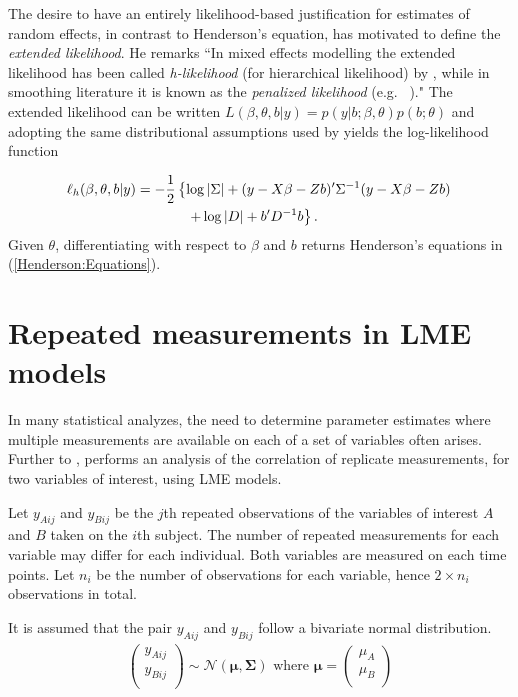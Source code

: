 \documentclass[12pt, a4paper]{article}
\theoremstyle{plain}
\theoremstyle{definition}
\theoremstyle{remark}
\begin{document}
The desire to have an entirely likelihood-based justification for estimates of random effects, in contrast to Henderson's equation, has motivated \citet[page 429]{Pawi:in:2001} to define the \emph{extended likelihood}. He remarks ``In mixed effects modelling the extended likelihood has been called \emph{h-likelihood} (for hierarchical  likelihood) by \cite{Lee:Neld:hier:1996}, while in smoothing literature it is known as the \emph{penalized likelihood} (e.g.\ \citeauthor{Gree:Silv:nonp:1994} \citeyear{Gree:Silv:nonp:1994})." The extended likelihood can be written $L(\beta,\theta,b|y) = p(y|b;\beta,\theta) p(b;\theta)$ and adopting the same distributional assumptions used by \cite{Henderson:1950} yields the log-likelihood function

\begin{eqnarray*}
\ell_h(\beta,\theta,b|y)
& = \displaystyle -\frac{1}{2} \left\{ \log|\Sigma| + (y - X \beta -Zb)'\Sigma^{-1}( y - X \beta -Zb) \right.\\
&  \hspace{0.5in} \left. + \log|D| + b^\prime D^{-1}b \right\}.
\end{eqnarray*}
Given $\theta$, differentiating with respect to $\beta$ and $b$ returns Henderson's equations in (\ref{Henderson:Equations}).
\section{Repeated measurements in LME models}

In many statistical analyzes, the need to determine parameter estimates where multiple measurements are available on each of a set of variables often arises. Further to \citet{lam}, \citet{hamlett} performs an analysis of the correlation of replicate measurements, for two variables of interest, using LME models.

Let $y_{Aij}$ and $y_{Bij}$ be the $j$th repeated observations of the variables of interest $A$ and $B$ taken on the $i$th subject. The number of repeated measurements for each variable may differ for each individual.
Both variables are measured on each time points. Let $n_{i}$ be the number of observations for each variable, hence $2\times n_{i}$ observations in total.

It is assumed that the pair $y_{Aij}$ and $y_{Bij}$ follow a bivariate normal distribution.
\begin{eqnarray*}
\left(
  \begin{array}{c}
    y_{Aij} \\
    y_{Bij} \\
  \end{array}
\right) \sim \mathcal{N}(
    \boldsymbol{\mu}, \boldsymbol{\Sigma})\mbox{   where } \boldsymbol{\mu} = \left(
  \begin{array}{c}
    \mu_{A} \\
    \mu_{B} \\
  \end{array}
\right)
\end{eqnarray*}
\end{document}
